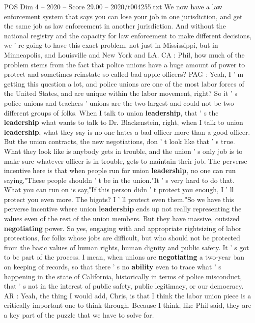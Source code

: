 \begin{textsample}{POS Dim 4 – 2020 – Score 29.00 – 2020/t004255.txt}
We now have a law enforcement system that says you can lose your job in one jurisdiction, and get the same job as law enforcement in another jurisdiction.
And without the national registry and the capacity for law enforcement to make different decisions, we ' re going to have this exact problem, not just in Mississippi, but in Minneapolis, and Louisville and New York and LA.
CA : Phil, how much of the problem stems from the fact that police unions have a huge amount of power to protect and sometimes reinstate so called bad apple officers?
PAG : Yeah, I ' m getting this question a lot, and police unions are one of the most labor forces of the United States, and are unique within the labor movement, right?
So it ' s police unions and teachers ' unions are the two largest and could not be two different groups of folks.
When I talk to union \textbf{leadership}, that ' s the \textbf{leadership} what wants to talk to Dr.
Blackenstein, right, when I talk to union \textbf{leadership}, what they say is no one hates a bad officer more than a good officer.
But the union contracts, the new negotiations, don ' t look like that ' s true.
What they look like is anybody gets in trouble, and the union ' s only job is to make sure whatever officer is in trouble, gets to maintain their job.
The perverse incentive here is that when people run for union \textbf{leadership}, no one can run saying,"These people shouldn ' t be in the union."It ' s very hard to do that.
What you can run on is say,"If this person didn ' t protect you enough, I ' ll protect you even more.
The bigots?
I ' ll protect even them."So we have this perverse incentive where union \textbf{leadership} ends up not really representing the values even of the rest of the union members.
But they have massive, outsized \textbf{negotiating} power.
So yes, engaging with and appropriate rightsizing of labor protections, for folks whose jobs are difficult, but who should not be protected from the basic values of human rights, human dignity and public safety.
It ' s got to be part of the process.
I mean, when unions are \textbf{negotiating} a two-year ban on keeping of records, so that there ' s no \textbf{ability} even to trace what ' s happening in the state of California, historically in terms of police misconduct, that ' s not in the interest of public safety, public legitimacy, or our democracy.
AR : Yeah, the thing I would add, Chris, is that I think the labor union piece is a critically important one to think through.
Because I think, like Phil said, they are a key part of the puzzle that we have to solve for.

\end{textsample}

